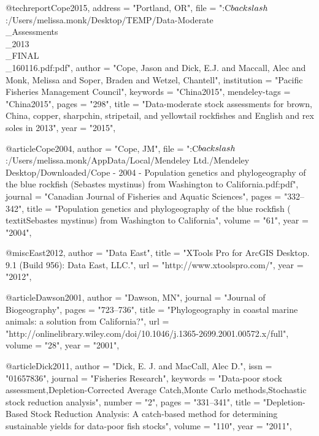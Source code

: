 @techreport{Cope2015,
    address = "{Portland, OR}",
    file = "{:C$\\backslash$:/Users/melissa.monk/Desktop/TEMP/Data-Moderate\\_Assessments\\_2013\\_FINAL\\_160116.pdf:pdf}",
    author = "{Cope, Jason and Dick, E.J. and Maccall, Alec and Monk, Melissa and Soper, Braden and Wetzel, Chantell}",
    institution = "{Pacific Fisheries Management Council}",
    keywords = "{China2015}",
    mendeley-tags = "{China2015}",
    pages = "{298}",
    title = "{{Data-moderate stock assessments for brown, China, copper, sharpchin, stripetail, and yellowtail rockfishes and English and rex soles in 2013}}",
    year = "{2015}",
}

@article{Cope2004,
    author = "{Cope, JM}",
    file = "{:C$\\backslash$:/Users/melissa.monk/AppData/Local/Mendeley Ltd./Mendeley Desktop/Downloaded/Cope - 2004 - Population genetics and phylogeography of the blue rockfish (Sebastes mystinus) from Washington to California.pdf:pdf}",
    journal = "{Canadian Journal of Fisheries and Aquatic Sciences}",
    pages = "{332--342}",
    title = "{{Population genetics and phylogeography of the blue rockfish (\\textit{{Sebastes} mystinus}) from Washington to California}}",
    volume = "{61}",
    year = "{2004}",
}

@misc{East2012,
    author = "{{Data East}}",
    title = "{{XTools Pro for ArcGIS Desktop. 9.1 (Build 956): Data East, LLC.}}",
    url = "{http://www.xtoolspro.com/}",
    year = "{2012}",
}

@article{Dawson2001,
    author = "{Dawson, MN}",
    journal = "{Journal of Biogeography}",
    pages = "{723--736}",
    title = "{{Phylogeography in coastal marine animals: a solution from California?}}",
    url = "{http://onlinelibrary.wiley.com/doi/10.1046/j.1365-2699.2001.00572.x/full}",
    volume = "{28}",
    year = "{2001}",
}

@article{Dick2011,
    author = "{Dick, E. J. and MacCall, Alec D.}",
    issn = "{01657836}",
    journal = "{Fisheries Research}",
    keywords = "{Data-poor stock assessment,Depletion-Corrected Average Catch,Monte Carlo methods,Stochastic stock reduction analysis}",
    number = "{2}",
    pages = "{331--341}",
    title = "{{Depletion-Based Stock Reduction Analysis: A catch-based method for determining sustainable yields for data-poor fish stocks}}",
    volume = "{110}",
    year = "{2011}",
}

